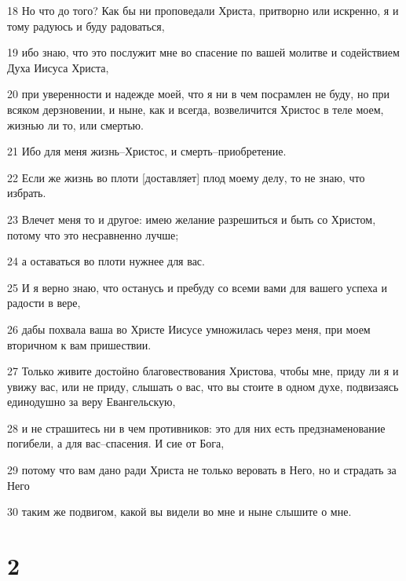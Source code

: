 \par 18 Но что до того? Как бы ни проповедали Христа, притворно или искренно, я и тому радуюсь и буду радоваться,
\par 19 ибо знаю, что это послужит мне во спасение по вашей молитве и содействием Духа Иисуса Христа,
\par 20 при уверенности и надежде моей, что я ни в чем посрамлен не буду, но при всяком дерзновении, и ныне, как и всегда, возвеличится Христос в теле моем, жизнью ли то, или смертью.
\par 21 Ибо для меня жизнь--Христос, и смерть--приобретение.
\par 22 Если же жизнь во плоти [доставляет] плод моему делу, то не знаю, что избрать.
\par 23 Влечет меня то и другое: имею желание разрешиться и быть со Христом, потому что это несравненно лучше;
\par 24 а оставаться во плоти нужнее для вас.
\par 25 И я верно знаю, что останусь и пребуду со всеми вами для вашего успеха и радости в вере,
\par 26 дабы похвала ваша во Христе Иисусе умножилась через меня, при моем вторичном к вам пришествии.
\par 27 Только живите достойно благовествования Христова, чтобы мне, приду ли я и увижу вас, или не приду, слышать о вас, что вы стоите в одном духе, подвизаясь единодушно за веру Евангельскую,
\par 28 и не страшитесь ни в чем противников: это для них есть предзнаменование погибели, а для вас--спасения. И сие от Бога,
\par 29 потому что вам дано ради Христа не только веровать в Него, но и страдать за Него
\par 30 таким же подвигом, какой вы видели во мне и ныне слышите о мне.

\chapter{2}

